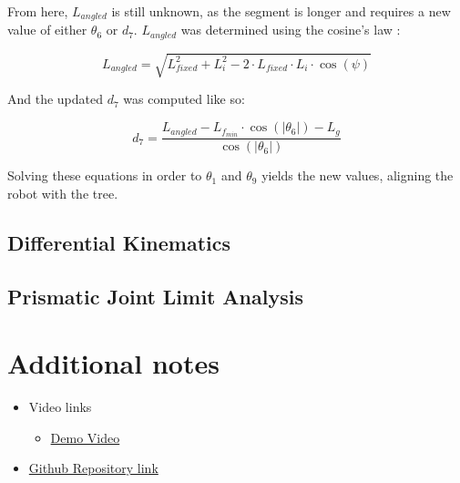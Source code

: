 \documentclass{report}
\begin{document}
From here, $L_{angled}$ is still unknown, as the segment is longer and requires
a new value of either $\theta_6$ or $d_7$. $L_{angled}$ was determined using the
cosine's law :

\begin{equation}
L_{angled} = \sqrt{L_{fixed}^2 + L_i^2 - 2 \cdot L_{fixed} \cdot L_i \cdot \cos(\psi)}
\end{equation}

And the updated $d_7$ was computed like so:

\begin{equation}
    d_7 = \frac{{L_{angled} - L_{f_{min}} \cdot \cos(\left| \theta_6 \right|) - L_g}}{{\cos(\left| \theta_6 \right|)}}
\end{equation}

Solving these equations in order to $\theta_1$ and $\theta_9$ yields the new values,
aligning the robot with the tree.






\subsection{Differential Kinematics}

\subsection{Prismatic Joint Limit Analysis}




\section{Additional notes}

\begin{itemize}

    \item Video links \begin{itemize}
              \item \href{}{Demo Video}
          \end{itemize}

    \item \href{https://github.com/brunofavs/TP2_RI}{Github Repository link}

\end{itemize}
\end{document}
